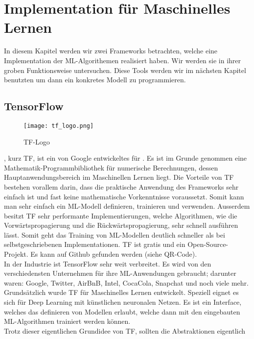 
\chapter{Implementation für Maschinelles Lernen}
In diesem Kapitel werden wir zwei Frameworks betrachten, welche eine
Implementation der ML-Algorithemen realisiert haben. Wir werden sie in ihrer
groben Funktionsweise untersuchen. Diese Tools werden wir im
nächsten Kapitel benutzten um dann ein konkretes Modell zu programmieren.

\section{TensorFlow}\label{sec:tensorflow}
\begin{wrapfigure}{l}{3cm}
  \texttt{[image: tf\_logo.png]}
  \caption{TF-Logo}
\end{wrapfigure}
, kurz TF, ist ein von Google entwickeltes  für
. Es ist im Grunde genommen eine
Mathematik-Programmbibliothek für numerische Berechnungen, dessen Hauptanwendungsbereich im Maschinellen Lernen
liegt. Die Vorteile von TF bestehen vorallem darin, dass die praktische
Anwendung des Frameworks sehr
einfach ist und fast keine mathematische Vorkenntnisse voraussetzt. Somit kann
man sehr einfach ein ML-Modell definieren, trainieren und verwenden. Ausserdem
besitzt TF sehr performante Implementierungen, welche Algorithmen, wie die
Vorwärtspropagierung und die Rückwärtspropagierung, sehr schnell ausführen
lässt. Somit geht das Training von ML-Modellen deutlich schneller als bei
selbstgeschriebenen Implementationen.
TF ist gratis und ein Open-Source-Projekt. Es kann auf Github gefunden werden
(siehe QR-Code). \\
\para{}
In der Industrie ist TensorFlow sehr weit verbreitet. Es wird von den
verschiedensten Unternehmen für ihre ML-Anwendungen gebraucht; darunter waren:
Google, Twitter, AirBnB, Intel, CocaCola, Snapchat und noch viele mehr.
\para{}
Grundsätzlich wurde TF für Maschinelles Lernen entwickelt. Speziell eignet es
sich für Deep Learning mit künstlichen neuronalen Netzen. Es ist ein
Interface, welches das definieren von Modellen erlaubt, welche dann mit den
eingebauten ML-Algorithmen trainiert werden können. \\
Trotz dieser eigentlichen Grundidee von TF, sollten die Abstraktionen eigentlich
